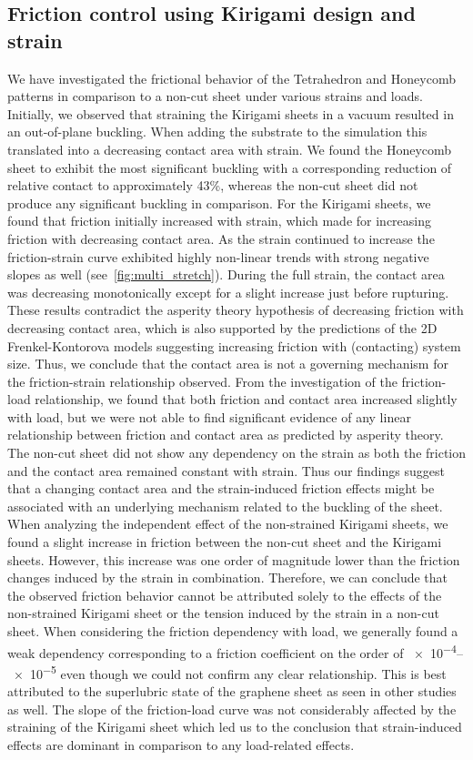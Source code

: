 \subsection{Friction control using Kirigami design and strain}
We have investigated the frictional behavior of the Tetrahedron and Honeycomb
patterns in comparison to a non-cut sheet under various strains and loads.
Initially, we observed that straining the Kirigami sheets in a vacuum resulted
in an out-of-plane buckling. When adding the substrate to the simulation this
translated into a decreasing contact area with strain. We found the Honeycomb
sheet to exhibit the most significant buckling with a corresponding reduction of
relative contact to approximately 43\%, whereas the non-cut sheet did not
produce any significant buckling in comparison. For the Kirigami sheets, we
found that friction initially increased with strain, which made for increasing
friction with decreasing contact area. As the strain continued to increase the
friction-strain curve exhibited highly non-linear trends with strong negative
slopes as well (see~\cref{fig:multi_stretch}). During the full strain, the
contact area was decreasing monotonically except for a slight increase just
before rupturing. These results contradict the asperity theory hypothesis of
decreasing friction with decreasing contact area, which is also supported by the
predictions of the 2D Frenkel-Kontorova models suggesting increasing friction
with (contacting) system size. Thus, we conclude that the contact area is not a
governing mechanism for the friction-strain relationship observed. From the
investigation of the friction-load relationship, we found that both friction and
contact area increased slightly with load, but we were not able to find
significant evidence of any linear relationship between friction and contact
area as predicted by asperity theory. The non-cut sheet did not show any
dependency on the strain as both the friction and the contact area remained
constant with strain. Thus our findings suggest that a changing contact area and
the strain-induced friction effects might be associated with an underlying
mechanism related to the buckling of the sheet. When analyzing the independent
effect of the non-strained Kirigami sheets, we found a slight increase in
friction between the non-cut sheet and the Kirigami sheets. However, this
increase was one order of magnitude lower than the friction changes induced by
the strain in combination. Therefore, we can conclude that the observed friction
behavior cannot be attributed solely to the effects of the non-strained Kirigami
sheet or the tension induced by the strain in a non-cut sheet. When considering the friction dependency with load, we generally found a weak
dependency corresponding to a friction coefficient on the order of
\num{e-4}--\num{e-5} even though we could not confirm any clear relationship.
This is best attributed to the superlubric state of the graphene sheet as seen in
other studies as well. The slope of the friction-load curve was not considerably
affected by the straining of the Kirigami sheet which led us to the conclusion
that strain-induced effects are dominant in comparison to any load-related
effects. 


